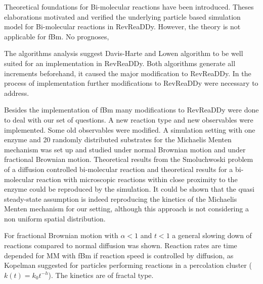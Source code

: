 \documentclass[
  a4paper,BCOR10mm,oneside,
  headsepline,footsepline,%
  fleqn,openbib
]{scrbook}
\begin{document}
Theoretical foundations for Bi-molecular reactions have been introduced.  Theses elaborations motivated and verified the underlying particle based simulation model for Bi-molecular reactions in RevReaDDy. However, the theory is not applicable for fBm. No prognoses, 





The algorithms analysis suggest Davis-Harte and Lowen algorithm to be well suited for an implementation in RevReaDDy. Both algorithms generate all increments beforehand, it caused the major modification to RevReaDDy. In the process of implementation further modifications to RevReaDDy were necessary to address. 


Besides the implementation of fBm many modifications to RevReaDDy were done to deal with our set of questions. A new reaction type and new observables were implemented. Some old observables were modified. A simulation setting with one enzyme and 20 randomly distributed substrates for the Michaelis Menten mechanism was set up and studied under normal Brownian motion and under fractional Brownian motion. Theoretical results from the Smoluchwoski problem of a diffusion controlled bi-molecular reaction and theoretical results for a bi-molecular reaction with microscopic reactions within close proximity to the enzyme could be reproduced by the simulation. It could be shown that the quasi steady-state assumption is indeed reproducing the kinetics of the Michaelis Menten mechanism for our setting, although this approach is not considering a non uniform spatial distribution.\par For fractional Brownian motion with $\alpha<1$ and  $t<1$ a general slowing down of reactions compared to normal diffusion was shown. Reaction rates are time depended for MM with fBm if reaction speed is controlled by diffusion, as Kopelman suggested for particles performing reactions in a percolation cluster ($k(t)=k_0 t^{-h}$). The kinetics are of fractal type.  \par
\end{document}
